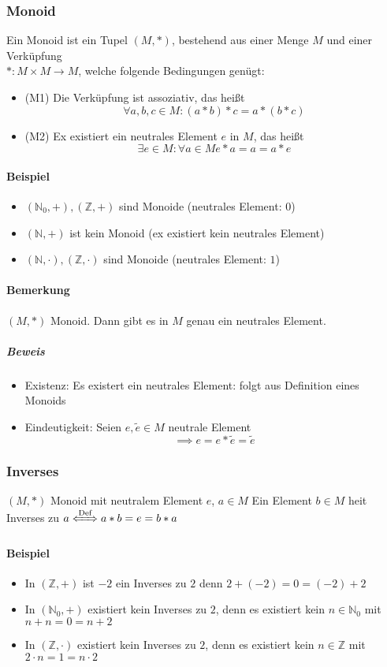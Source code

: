 \documentclass[a4paper]{scrartcl}
\DeclareMathOperator{\Forall}{\forall}
\theoremstyle{definition}
\theoremstyle{plain}
\theoremstyle{plain}
\theoremstyle{remark}
\theoremstyle{remark}
\theoremstyle{remark}
\theoremstyle{remark}
\theoremstyle{remark}
\begin{document}
\subsubsection{Monoid}
\label{sec-3-1-2}
Ein Monoid ist ein Tupel $(M,*)$, bestehend aus einer Menge $M$ und einer Verküpfung \\
    $*:M\times M \to M$, welche folgende Bedingungen genügt:
\begin{itemize}
\item (M1) Die Verküpfung ist assoziativ, das heißt \[\Forall a,b,c\in M:(a*b)*c = a*(b*c) \]
\item (M2) Ex existiert ein neutrales Element $e$ in $M$, das heißt \[\exists e\in M:\Forall a\in M e*a = a = a*e\]
\end{itemize}
\paragraph{Beispiel}
\label{sec-3-1-2-1}
\begin{itemize}
\item $(\mathbb{N}_0,+), (\mathbb{Z},+)$ sind Monoide (neutrales Element: $0$)
\item $(\mathbb{N},+)$ ist kein Monoid (ex existiert kein neutrales Element)
\item $(\mathbb{N},\cdot),(\mathbb{Z},\cdot)$ sind Monoide (neutrales Element: $1$)
\end{itemize}
\paragraph{Bemerkung}
\label{sec-3-1-2-2}
$(M,*)$ Monoid. Dann gibt es in $M$ genau ein neutrales Element.
\subparagraph{Beweis}
\label{sec-3-1-2-2-1}
\begin{itemize}
\item Existenz: Es existert ein neutrales Element: folgt aus Definition eines Monoids
\item Eindeutigkeit: Seien $e,\tilde e \in M$ neutrale Element \[\implies e = e * \tilde e = \tilde e\]
\end{itemize}
\subsubsection{Inverses}
\label{sec-3-1-3}
$(M,*)$ Monoid mit neutralem Element $e$, $a\in M$
Ein Element $b\in M$ heit Inverses zu $a \xLeftrightarrow{\text{Def}} a * b = e = b * a$
\paragraph{Beispiel}
\label{sec-3-1-3-1}
\begin{itemize}
\item In $(\mathbb{Z},+)$ ist $-2$ ein Inverses zu $2$ denn $2 + (-2) = 0 = (-2) + 2$
\item In $(\mathbb{N}_0,+)$ existiert kein Inverses zu $2$, denn es existiert kein $n\in \mathbb{N}_0$ mit $n + n = 0 = n + 2$
\item \label{invex} In $(\mathbb{Z},\cdot)$ existiert kein Inverses zu $2$, denn es existiert kein $n\in\mathbb{Z}$ mit $2\cdot n = 1 = n \cdot 2$
\end{itemize}
\end{document}
